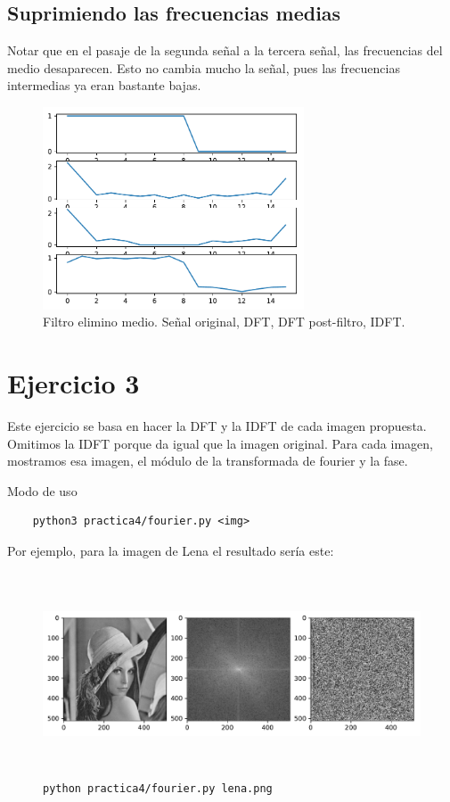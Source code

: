 \documentclass[11pt, spanish]{article}
\begin{document}
\subsection{Suprimiendo las frecuencias medias}

Notar que en el pasaje de la segunda señal a la tercera señal, las frecuencias del medio desaparecen.
Esto no cambia mucho la señal, pues las frecuencias intermedias ya eran bastante bajas.
\begin{figure}[H]
\centering
  \includegraphics[height=6cm]{informe-imgs/ej2-elimino-medio.pdf}
  \caption{Filtro elimino medio. Señal original, DFT, DFT post-filtro, IDFT.}
\end{figure}

\newpage
\section{Ejercicio 3}

Este ejercicio se basa en hacer la DFT y la IDFT de cada imagen propuesta. Omitimos la IDFT porque da igual que la
imagen original.
Para cada imagen, mostramos esa imagen, el módulo de la transformada de fourier y la fase.

Modo de uso
\begin{verbatim}
    python3 practica4/fourier.py <img>
\end{verbatim}

Por ejemplo, para la imagen de Lena el resultado sería este:

\begin{figure}[H]
\centering
  \includegraphics[height=6cm]{informe-imgs/ej3-lena.pdf}
  \caption{\texttt{python practica4/fourier.py lena.png}}
\end{figure}
\end{document}
